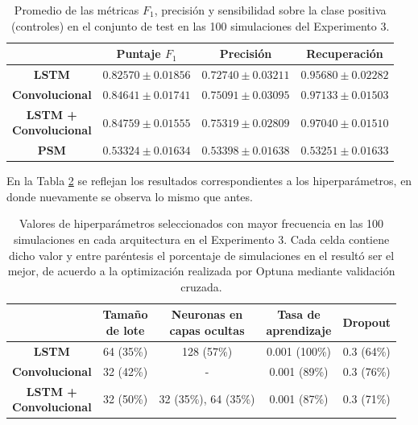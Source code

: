 \documentclass[../../main.tex]{subfiles}
\begin{document}
\begin{table}[ht]
    \centering
    \renewcommand{\arraystretch}{1.2}
    \begin{tabular}{|c|c|c|c|}
        \hline
         & \textbf{Puntaje} \(F_1\) & \textbf{Precisión} & \textbf{Recuperación} \\ \hline\hline
        \textbf{LSTM}
            & $0.82570 \pm 0.01856$ & $0.72740 \pm 0.03211$ & $0.95680 \pm 0.02282$ \\ \hline
        \textbf{Convolucional}
            & $0.84641 \pm 0.01741$ & $0.75091 \pm 0.03095$ & $\mathbf{0.97133 \pm 0.01503}$ \\ \hline
        \makecell{\textbf{LSTM +} \\ \textbf{Convolucional}}
            & $\mathbf{0.84759 \pm 0.01555}$ & $\mathbf{0.75319 \pm 0.02809}$ & $0.97040 \pm 0.01510$ \\ \hline
        \textbf{PSM}
            & $0.53324 \pm 0.01634$ & $0.53398 \pm 0.01638$ & $0.53251 \pm 0.01633$ \\
        \hline
    \end{tabular}
    \caption{Promedio de las métricas \(F_1\), precisión y sensibilidad sobre la
    clase positiva (controles) en el conjunto de test en las 100 simulaciones del
    Experimento 3.}
    \label{tab:results_exp3}
\end{table}

En la Tabla \ref{tab:hyperparams_exp3} se reflejan los resultados correspondientes
a los hiperparámetros, en donde nuevamente se observa lo mismo que antes.

\begin{table}[H]
    \centering
    \renewcommand{\arraystretch}{1.2}
    \begin{tabular}{|c|c|c|c|c|}
        \hline
            & \makecell{\textbf{Tamaño}\\\textbf{de lote}}
            & \makecell{\textbf{Neuronas en}\\\textbf{capas ocultas}}
            & \makecell{\textbf{Tasa de}\\\textbf{aprendizaje}}
            & \textbf{Dropout} \\ \hline\hline
        \textbf{LSTM}
            & 64 (35\%) & 128 (57\%) & 0.001 (100\%) & 0.3 (64\%) \\ \hline
        \textbf{Convolucional}
            & 32 (42\%) & -          & 0.001 (89\%)  & 0.3 (76\%) \\ \hline
        \makecell{\textbf{LSTM +}\\\textbf{Convolucional}}
            & 32 (50\%) & 32 (35\%), 64 (35\%) & 0.001 (87\%) & 0.3 (71\%) \\
        \hline
    \end{tabular}
    \caption{Valores de hiperparámetros seleccionados con mayor frecuencia en las 100
    simulaciones en cada arquitectura en el Experimento 3. Cada celda contiene dicho valor
    y entre paréntesis el porcentaje de simulaciones en el resultó ser el mejor, de
    acuerdo a la optimización realizada por Optuna mediante validación cruzada.}
    \label{tab:hyperparams_exp3}
\end{table}
\end{document}
